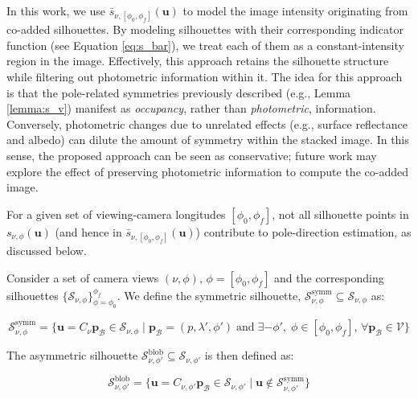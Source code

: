 In this work, we use $\bar{s}_{\nu,[\phi_0,\phi_f]}(\mathbf{u})$ to model the image intensity originating from co-added silhouettes. By modeling silhouettes with their corresponding indicator function (see Equation \ref{eq:s_bar}), we treat each of them as a constant-intensity region in the image. Effectively, this approach retains the silhouette structure while filtering out photometric information within it. The idea for this approach is that the pole-related symmetries previously described (e.g., Lemma \ref{lemma:s_v}) manifest as \textit{occupancy}, rather than \textit{photometric}, information. Conversely, photometric changes due to unrelated effects (e.g., surface reflectance and albedo) can dilute the amount of symmetry within the stacked image. In this sense, the proposed approach can be seen as conservative; future work may explore the effect of preserving photometric information to compute the co-added image.

For a given set of viewing-camera longitudes $[\phi_0, \phi_f]$, not all silhouette points in $s_{\nu,\phi}(\mathbf{u})$ (and hence in $\bar{s}_{\nu,[\phi_0,\phi_f]}(\mathbf{u})$) contribute to pole-direction estimation, as discussed below.

\begin{definition}
    \label{def:s_signal}
    Consider a set of camera views $(\nu,\phi),\,\phi=[\phi_0,\phi_f]$ and the corresponding silhouettes $\{\mathcal{S}_{\nu,\phi}\}_{\phi=\phi_0}^{\phi_f}$. We define the symmetric silhouette, $\mathcal{S}^\mathrm{symm}_{\nu,\phi} \subseteq \mathcal{S}_{\nu,\phi}$ as:

    \begin{equation}
        \mathcal{S}^\mathrm{symm}_{\nu,\phi} = \{ \mathbf{u}=C_\nu \mathbf{p}_\mathcal{B}\in\mathcal{S}_{\nu,\phi} \; | \; \mathbf{p}_\mathcal{B} = (p,\lambda',\phi') \; \text{and} \; \exists -\phi',\; \phi\in [\phi_0,\phi_f], \,\forall \mathbf{p}_\mathcal{B}\in\mathcal{V} \}
    \end{equation}

    The asymmetric silhouette $\mathcal{S}^\mathrm{blob}_{\nu,\phi'} \subseteq \mathcal{S}_{\nu,\phi'}$ is then defined as:

    \begin{equation}
        \mathcal{S}^\mathrm{blob}_{\nu,\phi'} = \{ \mathbf{u}=C_{\nu,\phi'} \mathbf{p}_\mathcal{B}\in\mathcal{S}_{\nu,\phi'} \; | \; \mathbf{u} \notin \mathcal{S}^\mathrm{symm}_{\nu,\phi'} \}
    \end{equation}
\end{definition}

